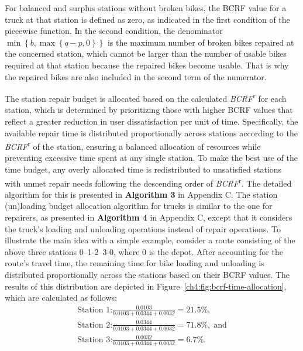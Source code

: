 For balanced and surplus stations without broken bikes, the BCRF value for a truck at that station
is defined as zero, as indicated in the first condition of the piecewise function. In the second
condition, the denominator \(\min\left\{ {b,\max\left\{ {q - p,0} \right\}} \right\}\) is the
maximum number of broken bikes repaired at the concerned station, which cannot be larger than the
number of usable bikes required at that station because the repaired bikes become usable. That is
why the repaired bikes are also included in the second term of the numerator.

The station repair budget is allocated based on the calculated \emph{BCRF}\textsuperscript{r} for
each station, which is determined by prioritizing those with higher BCRF values that reflect a
greater reduction in user dissatisfaction per unit of time. Specifically, the available repair time
is distributed proportionally across stations according to the \emph{BCRF}\textsuperscript{r} of the
station, ensuring a balanced allocation of resources while preventing excessive time spent at any
single station. To make the best use of the time budget, any overly allocated time is redistributed
to unsatisfied stations with unmet repair needs following the descending order of
\emph{BCRF}\textsuperscript{r}. The detailed algorithm for this is presented in \textbf{Algorithm 3}
in Appendix C. The station (un)loading budget allocation algorithm for trucks is similar to the one
for repairers, as presented in \textbf{Algorithm 4} in Appendix C, except that it considers the
truck's loading and unloading operations instead of repair operations. To illustrate the main idea
with a simple example, consider a route consisting of the above three stations 0--1-2--3-0, where 0
is the depot. After accounting for the route's travel time, the remaining time for bike loading and
unloading is distributed proportionally across the stations based on their BCRF values. The results
of this distribution are depicted in Figure~\ref{ch4:fig:bcrf-time-allocation}, which are calculated as follows:
\begin{equation}
\begin{array}{l}
{\text{Station 1:}\frac{0.0103}{0.0103 + 0.0344 + 0.0032} = 21.5\%,} \\
{\text{Station 2:}\frac{0.0344}{0.0103 + 0.0344 + 0.0032} = 71.8\%,\;\text{and}} \\
{\text{Station 3:}\frac{0.0032}{0.0103 + 0.0344 + 0.0032} = 6.7\%.}
\end{array}
\end{equation}

